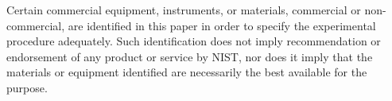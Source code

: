 \begin{titlepage}
\begin{flushleft}
\footnotesize  Certain commercial equipment, instruments, or materials, commercial or non-commercial, are identified in this paper in order to specify the experimental procedure adequately. Such identification does not imply recommendation or endorsement of any product or service by NIST, nor does it imply that the materials or equipment identified are necessarily the best available for the purpose.\\ 

\end{flushleft}
\end{titlepage}
